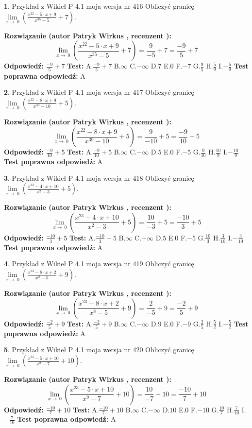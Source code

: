 \documentclass[12pt, a4paper]{article}
\theoremstyle{definition} %
\newtheorem{zad}{}
\newcommand{\zadStart}[1]{\begin{zad}#1\newline}
\newcommand{\zadStop}{\end{zad}}
\newcommand{\rozwStart}[2]{\noindent \textbf{Rozwiązanie (autor #1 , recenzent #2): }\newline}
\newcommand{\rozwStop}{\newline}
\newcommand{\odpStart}{\noindent \textbf{Odpowiedź:}\newline}
\newcommand{\odpStop}{\newline}
\newcommand{\testStart}{\noindent \textbf{Test:}\newline}
\newcommand{\testStop}{\newline}
\newcommand{\kluczStart}{\noindent \textbf{Test poprawna odpowiedź:}\newline}
\newcommand{\kluczStop}{\newline}
\begin{document}
\zadStart{Przykład z Wikieł P 4.1 moja wersja nr 416}
Obliczyć granicę $\lim\limits_{x\to\ 0}(\frac{x^{22}-5 \cdot x +9}{x^{35}-5}+7)$.
\zadStop
\rozwStart{Patryk Wirkus}{}
$$\lim\limits_{x\to\ 0}(\frac{x^{22}-5 \cdot x +9}{x^{35}-5}+7)=\frac{9}{-5}+7=\frac{-9}{5}+7$$
\rozwStop
\odpStart
$\frac{-9}{5}+7$
\odpStop
\testStart
A.$\frac{-9}{5}+7$
B.$\infty$
C.$-\infty$
D.$7$
E.$0$
F.$-7$
G.$\frac{9}{5}$
H.$\frac{5}{9}$
I.$-\frac{5}{9}$
\testStop
\kluczStart
A
\kluczStop



\zadStart{Przykład z Wikieł P 4.1 moja wersja nr 417}
Obliczyć granicę $\lim\limits_{x\to\ 0}(\frac{x^{22}-8 \cdot x +9}{x^{39}-10}+5)$.
\zadStop
\rozwStart{Patryk Wirkus}{}
$$\lim\limits_{x\to\ 0}(\frac{x^{22}-8 \cdot x +9}{x^{39}-10}+5)=\frac{9}{-10}+5=\frac{-9}{10}+5$$
\rozwStop
\odpStart
$\frac{-9}{10}+5$
\odpStop
\testStart
A.$\frac{-9}{10}+5$
B.$\infty$
C.$-\infty$
D.$5$
E.$0$
F.$-5$
G.$\frac{9}{10}$
H.$\frac{10}{9}$
I.$-\frac{10}{9}$
\testStop
\kluczStart
A
\kluczStop



\zadStart{Przykład z Wikieł P 4.1 moja wersja nr 418}
Obliczyć granicę $\lim\limits_{x\to\ 0}(\frac{x^{23}-4 \cdot x +10}{x^{2}-3}+5)$.
\zadStop
\rozwStart{Patryk Wirkus}{}
$$\lim\limits_{x\to\ 0}(\frac{x^{23}-4 \cdot x +10}{x^{2}-3}+5)=\frac{10}{-3}+5=\frac{-10}{3}+5$$
\rozwStop
\odpStart
$\frac{-10}{3}+5$
\odpStop
\testStart
A.$\frac{-10}{3}+5$
B.$\infty$
C.$-\infty$
D.$5$
E.$0$
F.$-5$
G.$\frac{10}{3}$
H.$\frac{3}{10}$
I.$-\frac{3}{10}$
\testStop
\kluczStart
A
\kluczStop



\zadStart{Przykład z Wikieł P 4.1 moja wersja nr 419}
Obliczyć granicę $\lim\limits_{x\to\ 0}(\frac{x^{23}-8 \cdot x +2}{x^{8}-5}+9)$.
\zadStop
\rozwStart{Patryk Wirkus}{}
$$\lim\limits_{x\to\ 0}(\frac{x^{23}-8 \cdot x +2}{x^{8}-5}+9)=\frac{2}{-5}+9=\frac{-2}{5}+9$$
\rozwStop
\odpStart
$\frac{-2}{5}+9$
\odpStop
\testStart
A.$\frac{-2}{5}+9$
B.$\infty$
C.$-\infty$
D.$9$
E.$0$
F.$-9$
G.$\frac{2}{5}$
H.$\frac{5}{2}$
I.$-\frac{5}{2}$
\testStop
\kluczStart
A
\kluczStop



\zadStart{Przykład z Wikieł P 4.1 moja wersja nr 420}
Obliczyć granicę $\lim\limits_{x\to\ 0}(\frac{x^{23}-5 \cdot x +10}{x^{9}-7}+10)$.
\zadStop
\rozwStart{Patryk Wirkus}{}
$$\lim\limits_{x\to\ 0}(\frac{x^{23}-5 \cdot x +10}{x^{9}-7}+10)=\frac{10}{-7}+10=\frac{-10}{7}+10$$
\rozwStop
\odpStart
$\frac{-10}{7}+10$
\odpStop
\testStart
A.$\frac{-10}{7}+10$
B.$\infty$
C.$-\infty$
D.$10$
E.$0$
F.$-10$
G.$\frac{10}{7}$
H.$\frac{7}{10}$
I.$-\frac{7}{10}$
\testStop
\kluczStart
A
\kluczStop
\end{document}
